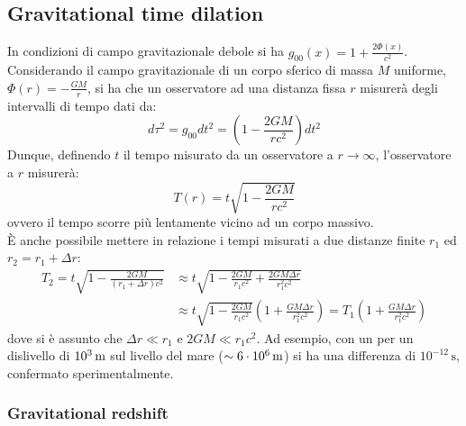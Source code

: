 \subsection{Gravitational time dilation}

In condizioni di campo gravitazionale debole si ha $ g_{00}(x) = 1 + \frac{2\Phi(x)}{c^2} $. Considerando il campo gravitazionale di un corpo sferico di massa $ M $ uniforme, $ \Phi(r) = - \frac{GM}{r} $, si ha che un osservatore ad una distanza fissa $ r $ misurerà degli intervalli di tempo dati da:
\begin{equation}
  d\tau^2 = g_{00} dt^2 = \left( 1 - \frac{2GM}{rc^2} \right) dt^2
  \label{eq:1.39}
\end{equation}
Dunque, definendo $ t $ il tempo misurato da un osservatore a $ r \rightarrow \infty $, l'osservatore a $ r $ misurerà:
\begin{equation}
  T(r) = t \sqrt{1 - \frac{2GM}{rc^2}}
  \label{eq:1.40}
\end{equation}
ovvero il tempo scorre più lentamente vicino ad un corpo massivo.\\
È anche possibile mettere in relazione i tempi misurati a due distanze finite $ r_1 $ ed $ r_2 = r_1 + \Delta r $:
\begin{equation}
  \begin{split}
    T_2 = t \sqrt{1 - \frac{2GM}{(r_1 + \Delta r) c^2}} &\approx t \sqrt{1 - \frac{2GM}{r_1 c^2} + \frac{2GM \Delta r}{r_1^2 c^2}}\\
                                                        &\approx t \sqrt{1 - \frac{2GM}{r_1 c^2}} \left( 1 + \frac{GM \Delta r}{r_1^2 c^2} \right) = T_1 \left( 1 + \frac{GM \Delta r}{r_1^2 c^2} \right)
  \end{split}
  \label{eq:1.41}
\end{equation}
dove si è assunto che $ \Delta r \ll r_1 $ e $ 2GM \ll r_1 c^2 $. Ad esempio, con un per un dislivello di $ 10^3 \,\text{m} $ sul livello del mare ($ \sim 6\cdot10^6 \,\text{m} $) si ha una differenza di $ 10^{-12}\,\text{s} $, confermato sperimentalmente.

\subsubsection{Gravitational redshift}

